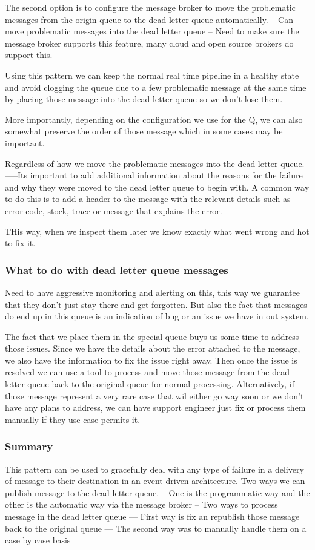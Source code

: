 \documentclass[a4paper, 11pt]{book}
\begin{document}
    The second option is to configure the message broker to move the problematic messages from the origin queue to the dead letter queue automatically.
    -- Can move problematic messages into the dead letter queue
    -- Need to make sure the message broker supports this feature, many cloud and open source brokers do support this.

    Using this pattern we can keep the normal real time pipeline in a healthy state and avoid clogging the queue due to a few problematic message at the same time by placing those message into the dead letter queue so we don't lose them.

    More importantly, depending on the configuration we use for the Q, we can also somewhat preserve the order of those message which in some cases may be important.

    Regardless of how we move the problematic messages into the dead letter queue.
    -----Its important to add additional information about the reasons for the failure and why they were moved to the dead letter queue to begin with.
    A common way to do this is to add a header to the message with the relevant details such as error code, stock, trace or message that explains the error.

    THis way, when we inspect them later we know exactly what went wrong and hot to fix it.

    \subsubsection{What to do with dead letter queue messages}
    Need to have aggressive monitoring and alerting on this, this way we guarantee that they don't just stay there and get forgotten.
    But also the fact that messages do end up in this queue is an indication of bug or an issue we have in out system.

    The fact that we place them in the special queue buys us some time to address those issues.
    Since we have the details about the error attached to the message, we also have the information to fix the issue right away.
    Then once the issue is resolved we can use a tool to process and move those message from the dead letter queue back to the original queue for normal processing.
    Alternatively, if those message represent a very rare case that wil either go way soon or we don't have any plans to address, we can have support engineer just fix or process them manually if they use case permits it.

    \subsubsection{Summary}
    This pattern can be used to gracefully deal with any type of failure in a delivery of message to their destination in an event driven architecture.
    Two ways we can publish message to the dead letter queue.
    -- One is the programmatic way and the other is the automatic way via the message broker
    -- Two ways to process message in the dead letter queue
    --- First way is fix an republish those message back to the original queue
    --- The second way was to manually handle them on a case by case basis
\end{document}

